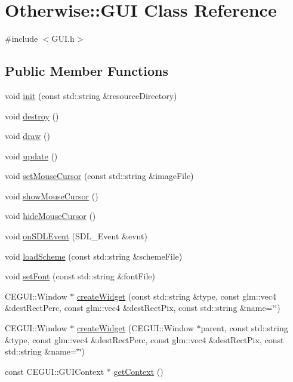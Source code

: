 \hypertarget{class_otherwise_1_1_g_u_i}{}\section{Otherwise\+:\+:G\+UI Class Reference}
\label{class_otherwise_1_1_g_u_i}


{\ttfamily \#include $<$G\+U\+I.\+h$>$}

\subsection*{Public Member Functions}
\begin{DoxyCompactItemize}
\item 
void \hyperlink{class_otherwise_1_1_g_u_i_af5a8499f09a6fb67c60febe056d6d15d}{init} (const std\+::string \&resource\+Directory)
\item 
void \hyperlink{class_otherwise_1_1_g_u_i_a4f90a71192bc9b839817e4fea43daf90}{destroy} ()
\item 
void \hyperlink{class_otherwise_1_1_g_u_i_a44cfa8af4d72df100699e099ebc696ad}{draw} ()
\item 
void \hyperlink{class_otherwise_1_1_g_u_i_a9a3bc9b03b0910f7cc9968a090cc2af1}{update} ()
\item 
void \hyperlink{class_otherwise_1_1_g_u_i_a53e464baf6ce525c9832afddc24700d6}{set\+Mouse\+Cursor} (const std\+::string \&image\+File)
\item 
void \hyperlink{class_otherwise_1_1_g_u_i_ad684b9943a6c148261f7f5620324be05}{show\+Mouse\+Cursor} ()
\item 
void \hyperlink{class_otherwise_1_1_g_u_i_abae0d030311f1af04fdf750e83460c70}{hide\+Mouse\+Cursor} ()
\item 
void \hyperlink{class_otherwise_1_1_g_u_i_a802ecd12a45fbd24db58db4418cae985}{on\+S\+D\+L\+Event} (S\+D\+L\+\_\+\+Event \&evnt)
\item 
void \hyperlink{class_otherwise_1_1_g_u_i_a54c6fe7efc86547e9479d01d720b8cfa}{load\+Scheme} (const std\+::string \&scheme\+File)
\item 
void \hyperlink{class_otherwise_1_1_g_u_i_af77fb4b3616e97cb2f86dbfa497cc652}{set\+Font} (const std\+::string \&font\+File)
\item 
C\+E\+G\+U\+I\+::\+Window $\ast$ \hyperlink{class_otherwise_1_1_g_u_i_a210f438c6c5c52c34c8f2d5397cbab60}{create\+Widget} (const std\+::string \&type, const glm\+::vec4 \&dest\+Rect\+Perc, const glm\+::vec4 \&dest\+Rect\+Pix, const std\+::string \&name=\char`\"{}\char`\"{})
\item 
C\+E\+G\+U\+I\+::\+Window $\ast$ \hyperlink{class_otherwise_1_1_g_u_i_a147e9f8adc6d75ff4d04e10f708398b6}{create\+Widget} (C\+E\+G\+U\+I\+::\+Window $\ast$parent, const std\+::string \&type, const glm\+::vec4 \&dest\+Rect\+Perc, const glm\+::vec4 \&dest\+Rect\+Pix, const std\+::string \&name=\char`\"{}\char`\"{})
\item 
const C\+E\+G\+U\+I\+::\+G\+U\+I\+Context $\ast$ \hyperlink{class_otherwise_1_1_g_u_i_ac0499b56edd2d8b73381e90670b21e8d}{get\+Context} ()
\end{DoxyCompactItemize}

